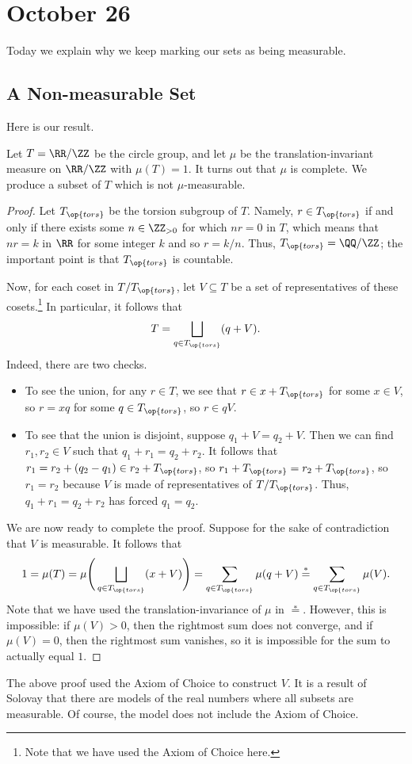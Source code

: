 \documentclass[../notes.tex]{subfiles}
\begin{document}
\section{October 26}

Today we explain why we keep marking our sets as being measurable.

\subsection{A Non-measurable Set}
Here is our result.
\begin{exe}[Vitali]
	Let $T=\RR/\ZZ$ be the circle group, and let $\mu$ be the translation-invariant measure on $\RR/\ZZ$ with $\mu(T)=1$. It turns out that $\mu$ is complete. We produce a subset of $T$ which is not $\mu$-measurable.
\end{exe}
\begin{proof}
	Let $T_{\op{tors}}$ be the torsion subgroup of $T$. Namely, $r\in T_{\op{tors}}$ if and only if there exists some $n\in\ZZ_{>0}$ for which $nr=0$ in $T$, which means that $nr=k$ in $\RR$ for some integer $k$ and so $r=k/n$. Thus, $T_{\op{tors}}=\QQ/\ZZ$; the important point is that $T_{\op{tors}}$ is countable.

	Now, for each coset in $T/T_{\op{tors}}$, let $V\subseteq T$ be a set of representatives of these cosets.\footnote{Note that we have used the Axiom of Choice here.} In particular, it follows that
	\[T=\bigsqcup_{q\in T_{\op{tors}}}(q+V).\]
	Indeed, there are two checks.
	\begin{itemize}
		\item To see the union, for any $r\in T$, we see that $r\in x+T_{\op{tors}}$ for some $x\in V$, so $r=xq$ for some $q\in T_{\op{tors}}$, so $r\in qV$.
		\item To see that the union is disjoint, suppose $q_1+V=q_2+V$. Then we can find $r_1,r_2\in V$ such that $q_1+r_1=q_2+r_2$. It follows that $r_1=r_2+(q_2-q_1)\in r_2+T_{\op{tors}}$, so $r_1+T_{\op{tors}}=r_2+T_{\op{tors}}$, so $r_1=r_2$ because $V$ is made of representatives of $T/T_{\op{tors}}$. Thus, $q_1+r_1=q_2+r_2$ has forced $q_1=q_2$.
	\end{itemize}
	We are now ready to complete the proof. Suppose for the sake of contradiction that $V$ is measurable. It follows that
	\[1=\mu(T)=\mu\Bigg(\bigsqcup_{q\in T_{\op{tors}}}(x+V)\Bigg)=\sum_{q\in T_{\op{tors}}}\mu(q+V)\stackrel*=\sum_{q\in T_{\op{tors}}}\mu(V).\]
	Note that we have used the translation-invariance of $\mu$ in $\stackrel*=$. However, this is impossible: if $\mu(V)>0$, then the rightmost sum does not converge, and if $\mu(V)=0$, then the rightmost sum vanishes, so it is impossible for the sum to actually equal $1$.
\end{proof}
\begin{remark}
	The above proof used the Axiom of Choice to construct $V$. It is a result of Solovay that there are models of the real numbers where all subsets are measurable. Of course, the model does not include the Axiom of Choice.
\end{remark}
\end{document}
